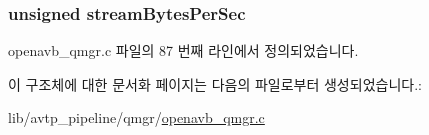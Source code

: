 \subsubsection[{\texorpdfstring{stream\+Bytes\+Per\+Sec}{streamBytesPerSec}}]{\setlength{\rightskip}{0pt plus 5cm}unsigned stream\+Bytes\+Per\+Sec}\hypertarget{structqmgr_stream__t_aa205bb2199ec3081785cc701ae7da809}{}\label{structqmgr_stream__t_aa205bb2199ec3081785cc701ae7da809}


openavb\+\_\+qmgr.\+c 파일의 87 번째 라인에서 정의되었습니다.



이 구조체에 대한 문서화 페이지는 다음의 파일로부터 생성되었습니다.\+:\begin{DoxyCompactItemize}
\item 
lib/avtp\+\_\+pipeline/qmgr/\hyperlink{openavb__qmgr_8c}{openavb\+\_\+qmgr.\+c}\end{DoxyCompactItemize}
